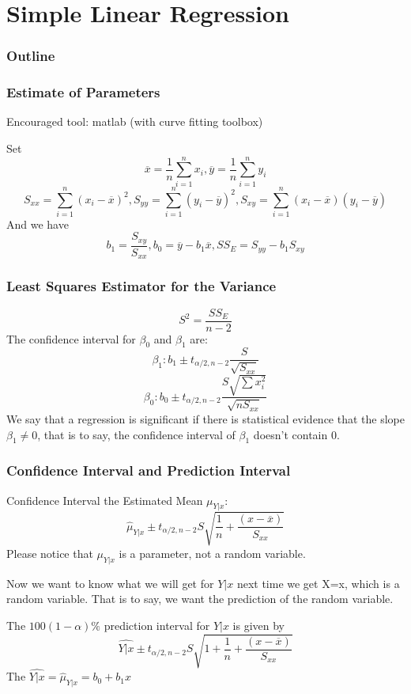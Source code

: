 \documentclass{beamer}
\begin{document}
\section{Simple Linear Regression}
\begin{frame}
    \frametitle{Outline}
    \tableofcontents[currentsection]
\end{frame}
\begin{frame}
    \frametitle{Estimate of Parameters}

    Encouraged tool: matlab (with curve fitting toolbox)\par
    Set 
    \[\overline{x}=\frac{1}{n} \sum\limits_{i=1}^{n} x_i, \overline{y}=\frac{1}{n} \sum\limits_{i=1}^{n} y_i\]
    \[S_{xx}=\sum\limits_{i=1}^{n}(x_i-\overline{x})^2, S_{yy}=\sum\limits_{i=1}^{n}(y_i-\overline{y})^2, S_{xy}=\sum\limits_{i=1}^{n}(x_i-\overline{x})(y_i-\overline{y})\]
    And we have 
    \[b_1=\frac{S_{xy}}{S_{xx}}, b_0=\overline{y}-b_1 \overline{x}, SS_E=S_{yy}-b_1 S_{xy}\]

\end{frame}

\begin{frame}
    \frametitle{Least Squares Estimator for the Variance}

    \[S^2=\frac{SS_E}{n-2}\]
    The confidence interval for $\beta_0$ and $\beta_1$ are:
    \[\beta_1: b_1\pm t_{\alpha/2, n-2} \frac{S}{\sqrt{S_{xx}}}\]
    \[\beta_0: b_0\pm t_{\alpha/2, n-2} \frac{S \sqrt{\sum x_i^2}}{\sqrt{n S_{xx}}}\]
    We say that a regression is significant if there is statistical evidence that
    the slope $\beta_1\neq 0$, that is to say, the confidence interval of $\beta_1$ doesn't contain 0.

\end{frame}

\begin{frame}
    \frametitle{Confidence Interval and Prediction Interval}

    Confidence Interval the Estimated Mean $\mu_{Y|x}$: 
    \[\hat{\mu}_{Y|x}\pm t_{\alpha/2, n-2}S\sqrt{\frac{1}{n}+\frac{(x-\overline{x})}{S_{xx}}}\]
    Please notice that $\mu_{Y|x}$ is a parameter, not a random variable.\par
    Now we want to know what we will get for $Y|x$ next time we get X=x, which is a random variable. That is to say, we want the prediction of the random variable.\par
    The $100(1-\alpha)\%$ prediction interval for $Y|x$ is given by
    \[\widehat{Y|x}\pm t_{\alpha/2, n-2}S\sqrt{1+\frac{1}{n}+\frac{(x-\overline{x})}{S_{xx}}}\]
    The $\widehat{Y|x}=\hat{\mu}_{Y|x}=b_0+b_1 x$

\end{frame}
\end{document}
